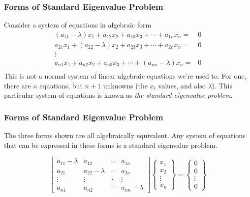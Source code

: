 \documentclass[fleqn]{beamer} %
\newcommand{\sectionIIsubsectionItitle}{Forms of Standard Eigenvalue Problem}
\begin{document}
			\begin{frame}[label=sectionIIsubsectionI]
				\frametitle{\sectionIIsubsectionItitle} \small
				\bigskip

				 Consider a system of equations in algebraic form
  \begin{align*}
    (a_{11}-\lambda) x_1 + a_{12} x_2 + a_{13} x_3 + \cdots + a_{1n} x_n =& 0 \\
    a_{21} x_1 + (a_{22}-\lambda) x_2 + a_{23} x_3 + \cdots + a_{2n} x_n =& 0 \\
    \vdots{}& \\
    a_{n1} x_1 + a_{n2} x_2 + a_{n3} x_3 + \cdots + (a_{nn}-\lambda) x_n =& 0 \\
  \end{align*}
  This is not a normal system of linear algebraic equations we're used
  to. For one, there are $n$ equations, but $n+1$ unknowns (the $x_i$
  values, and also $\lambda$). This particular system of equations is
  known as \emph{the standard eigenvalue problem}.


				\btVFill
			\end{frame}

			\begin{frame}[label=sectionIIsubsectionI]
				\frametitle{\sectionIIsubsectionItitle} \small
				\bigskip

 The three forms shown are all algebraically equivalent. Any system
  of equations that can be expressed in these forms is a standard
  eigenvalue problem.

  \begin{displaymath}
    \left[ \begin{array}{cccc}
        a_{11}-\lambda & a_{12} & \cdots & a_{1n} \\
        a_{21} & a_{22}-\lambda & \cdots & a_{2n} \\
        \vdots & \vdots & \ddots & \vdots \\
        a_{n1} & a_{n2} & \cdots & a_{nn}-\lambda
      \end{array} \right]
    \left\{ \begin{array}{c}
        x_1 \\
        x_2 \\
        \vdots \\
        x_n
      \end{array} \right\} =
    \left\{ \begin{array}{c}
        0 \\
        0 \\
        \vdots \\
        0
      \end{array} \right\}
  \end{displaymath}				

			
				\btVFill
			\end{frame}	
\end{document}
